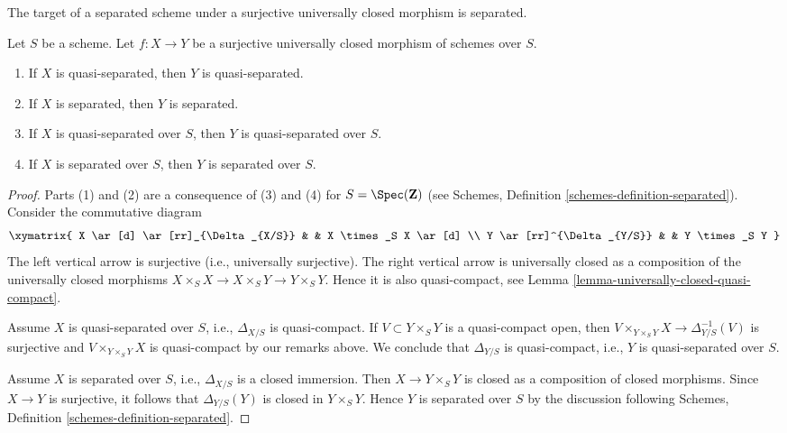\noindent
The target of a separated scheme under a surjective
universally closed morphism is separated.

\begin{lemma}
\label{lemma-image-universally-closed-separated}
Let $S$ be a scheme. Let $f : X \to Y$ be a surjective universally closed
morphism of schemes over $S$.
\begin{enumerate}
\item If $X$ is quasi-separated, then $Y$ is quasi-separated.
\item If $X$ is separated, then $Y$ is separated.
\item If $X$ is quasi-separated over $S$, then $Y$ is quasi-separated over $S$.
\item If $X$ is separated over $S$, then $Y$ is separated over $S$.
\end{enumerate}
\end{lemma}

\begin{proof}
Parts (1) and (2) are a consequence of (3) and (4) for
$S = \Spec(\mathbf{Z})$ (see
Schemes, Definition \ref{schemes-definition-separated}).
Consider the commutative diagram
$$
\xymatrix{
X \ar[d] \ar[rr]_{\Delta_{X/S}} & & X \times_S X \ar[d] \\
Y \ar[rr]^{\Delta_{Y/S}} & & Y \times_S Y
}
$$
The left vertical arrow is surjective (i.e., universally surjective).
The right vertical arrow is universally closed as a composition
of the universally closed morphisms
$X \times_S X \to X \times_S Y \to Y \times_S Y$. Hence it is also
quasi-compact, see
Lemma \ref{lemma-universally-closed-quasi-compact}.

\medskip\noindent
Assume $X$ is quasi-separated over $S$, i.e.,  $\Delta_{X/S}$ is
quasi-compact. If $V \subset Y \times_S Y$ is a quasi-compact
open, then $V \times_{Y \times_S Y} X \to \Delta_{Y/S}^{-1}(V)$
is surjective and $V \times_{Y \times_S Y} X$ is quasi-compact by our remarks
above. We conclude that $\Delta_{Y/S}$ is quasi-compact, i.e., $Y$
is quasi-separated over $S$.

\medskip\noindent
Assume $X$ is separated over $S$, i.e., $\Delta_{X/S}$ is a closed
immersion. Then $X \to Y \times_S Y$ is closed as a
composition of closed morphisms. Since $X \to Y$ is
surjective, it follows that $\Delta_{Y/S}(Y)$ is closed in $Y \times_S Y$.
Hence $Y$ is separated over $S$ by the discussion following
Schemes, Definition \ref{schemes-definition-separated}.
\end{proof}

